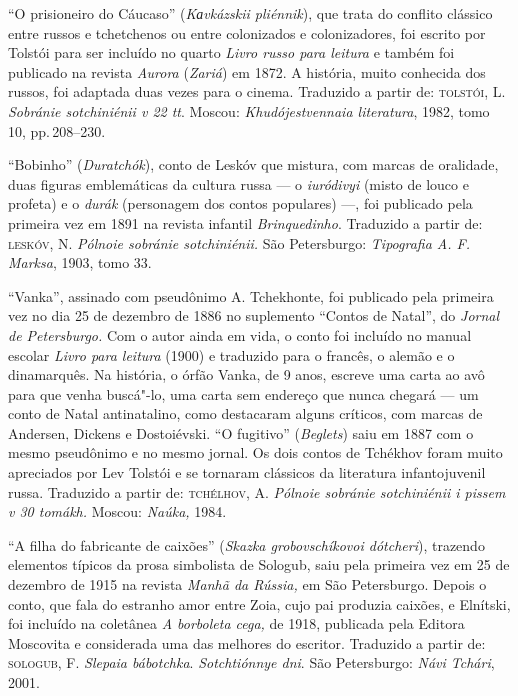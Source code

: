 \medskip

``O prisioneiro do Cáucaso'' (\emph{Kаvkázskii pliénnik}), que trata do
conflito clássico entre russos e tchetchenos ou entre colonizados e
colonizadores, foi escrito por Tolstói para ser incluído no quarto \emph{Livro russo
para leitura} e também foi publicado na revista \emph{Aurora}
(\emph{Zariá}) em 1872. A história, muito conhecida dos russos,
foi adaptada duas vezes para o cinema.
Traduzido a partir de:
\textsc{tolstói}, L. \emph{Sobránie sotchiniénii v 22 tt}. Moscou:
\emph{Khudójestvennaia literatura}, 1982, tomo 10, pp.\,208--230.

\medskip

``Bobinho'' (\emph{Duratchók}), conto de Leskóv que mistura, com marcas
de oralidade, duas figuras
emblemáticas da cultura russa --- o \emph{iuródivyi} (misto de louco e
profeta) e o \emph{durák} (personagem dos contos populares) ---, foi
publicado pela primeira vez em 1891 na revista infantil
\emph{Brinquedinho}. Traduzido a partir de:
\textsc{leskóv}, N. \emph{Pólnoie sobránie sotchiniénii.} São Petersburgo:
\emph{Tipografia A. F. Marksa}, 1903, tomo 33.

\medskip

``Vanka'', assinado com pseudônimo A. Tchekhonte, foi publicado pela
primeira vez no dia 25 de dezembro de 1886 no suplemento ``Contos de
Natal'', do \emph{Jornal de Petersburgo.} Com o autor ainda em vida, o
conto foi incluído no manual escolar \emph{Livro para leitura} (1900) e
traduzido para o francês, o alemão e o dinamarquês. Na história, o órfão
Vanka, de 9 anos, escreve uma carta ao avô para que venha buscá"-lo, uma
carta sem endereço que nunca chegará --- um conto de Natal
antinatalino, como destacaram alguns críticos, com marcas de Andersen,
Dickens e Dostoiévski. ``O fugitivo'' (\emph{Beglets}) saiu em 1887 com
o mesmo pseudônimo e no mesmo jornal. Os dois contos de Tchékhov foram muito
apreciados por Lev Tolstói e se tornaram clássicos da literatura
infantojuvenil russa.
Traduzido a partir de:
\textsc{tchélhov}, A. \emph{Pólnoie sobránie sotchiniénii i pissem v 30 tomákh.}
Moscou: \emph{Naúka,} 1984.

\medskip

``A filha do fabricante de caixões'' (\emph{Skazka grobovschíkovoi
dótcheri}), trazendo elementos típicos da prosa simbolista de Sologub,
saiu pela primeira vez em 25 de dezembro de 1915 na revista \emph{Manhã
da Rússia,} em São Petersburgo. Depois o conto, que fala do estranho
amor entre Zoia, cujo pai produzia caixões, e Elnítski, foi incluído na
coletânea \emph{A borboleta cega,} de 1918, publicada pela Editora
Moscovita e considerada uma das melhores do escritor.
Traduzido a partir de:
\textsc{sologub}, F. \emph{Slepaia bábotchka}. \emph{Sotchtiónnye dni}. São
Petersburgo: \emph{Návi Tchári}, 2001.

